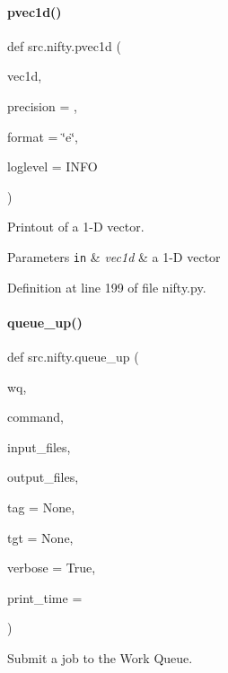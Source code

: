 \paragraph{\texorpdfstring{pvec1d()}{pvec1d()}}
{\footnotesize\ttfamily def src.\+nifty.\+pvec1d (\begin{DoxyParamCaption}\item[{}]{vec1d,  }\item[{}]{precision = {},  }\item[{}]{format = {\ttfamily \char`\"{}e\char`\"{}},  }\item[{}]{loglevel = {\ttfamily INFO} }\end{DoxyParamCaption})}



Printout of a 1-\/D vector. 


\begin{DoxyParams}[1]{Parameters}
\mbox{\tt in}  & {\em vec1d} & a 1-\/D vector \\
\hline
\end{DoxyParams}


Definition at line 199 of file nifty.\+py.

\mbox{\label{namespacesrc_1_1nifty_a1e3f0a07d4cb01636522cbef8b1e8c72}} 
\paragraph{\texorpdfstring{queue\+\_\+up()}{queue\_up()}}
{\footnotesize\ttfamily def src.\+nifty.\+queue\+\_\+up (\begin{DoxyParamCaption}\item[{}]{wq,  }\item[{}]{command,  }\item[{}]{input\+\_\+files,  }\item[{}]{output\+\_\+files,  }\item[{}]{tag = {\ttfamily None},  }\item[{}]{tgt = {\ttfamily None},  }\item[{}]{verbose = {\ttfamily True},  }\item[{}]{print\+\_\+time = {} }\end{DoxyParamCaption})}



Submit a job to the Work Queue. 


